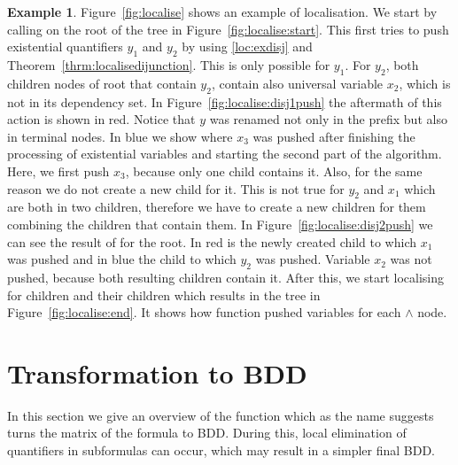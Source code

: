 \documentclass[
  digital, %
  color,
  twoside, %
  table,   %
  nolof,     %
  nolot,     %
]{fithesis3}
\theoremstyle{definition}
\newtheorem{example}{Example}
\theoremstyle{remark}
\begin{document}
\begin{example}
  \label{ex:QTlocalising}
  Figure~\ref{fig:localise} shows an example of localisation. We start by calling  on the root of the tree in Figure~\ref{fig:localise:start}. This first tries to push existential quantifiers $y_1$ and $y_2$ by using \eqref{loc:exdisj} and Theorem~\ref{thrm:localisedijunction}. This is only possible for $y_1$. For $y_2$, both children nodes of root that contain $y_2$, contain also universal variable $x_2$, which is not in its dependency set. In Figure~\ref{fig:localise:disj1push} the aftermath of this action is shown in red. Notice that $y$ was renamed not only in the prefix but also in terminal nodes. In blue we show where $x_3$ was pushed after finishing the processing of existential variables and starting the second part of the algorithm. Here, we first push $x_3$, because only one child contains it. Also, for the same reason we do not create a new child for it. This is not true for $y_2$ and $x_1$ which are both in two children, therefore we have to create a new children for them combining the children that contain them. In Figure~\ref{fig:localise:disj2push} we can see the result of  for the root. In red is the newly created child to which $x_1$ was pushed and in blue the child to which $y_2$ was pushed. Variable $x_2$ was not pushed, because both resulting children contain it. After this, we start localising for children and their children which results in the tree in Figure~\ref{fig:localise:end}. It shows how function  pushed variables for each ${\land}$ node.
\end{example}

\section{Transformation to BDD}
\label{sec:algturntobdd}
In this section we give an overview of the function  which as the name suggests turns the matrix of the formula to BDD. During this, local elimination of quantifiers in subformulas can occur, which may result in a simpler final BDD. 
\end{document}
